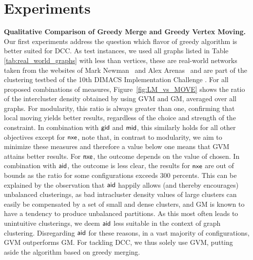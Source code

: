 \documentclass{llncs}
\newcommand{\measure}[1]{\ensuremath{\text{\normalfont{\sffamily {#1}}}}\xspace}
\newcommand{\andreapar}{\vspace*{.5ex}\par\noindent}
\begin{document}
\section{Experiments}
\andreapar\textbf{Qualitative Comparison of Greedy Merge and Greedy Vertex Moving.}
Our first experiments address the question which flavor of greedy algorithm is better suited for \textsc{DCC}.
As test instances, we used all graphs listed in Table \ref{tab:real_world_graphs} with less than  vertices, these are real-world networks taken from the websites of Mark Newman~\cite{newmanWS}
and Alex Arenas~\cite{arenasWS} and are part of the clustering testbed of the 10th DIMACS Implementation Challenge \cite{dimacsWS}.
For all proposed combinations of measures,
Figure~\ref{fig:LM_vs_MOVE} shows the ratio of the intercluster density obtained by using GVM and GM, averaged over all graphs.
For modularity, this ratio is always greater than one, confirming that local moving yields better results, regardless of the choice and strength of the constraint.
In combination with \measure{gid} and \measure{mid}, this similarly holds for all other objectives except for \measure{nxe}, note that, in contrast to modularity, we aim to minimize these measures and therefore a value below one means that GVM attains better results.
For \measure{nxe}, the outcome depends on the value of  chosen.
In combination with \measure{aid}, the outcome is less clear, the results for \measure{nxe} are out of bounds as the ratio for some configurations exceeds 300 percents.
This can be explained by the observation that \measure{aid} happily allows (and thereby encourages) unbalanced clusterings, as bad intracluster density values of large clusters can easily be compensated by a set of small and dense clusters, and GM is known to have a tendency to produce unbalanced partitions.
As this most often leads to unintuitive clusterings, we deem \measure{aid} less suitable in the context of graph clustering.
Disregarding \measure{aid} for these reasons, in a vast majority of configurations, GVM outperforms GM. 
For tackling \textsc{DCC}, we thus solely use GVM, putting aside the algorithm based on greedy merging.
\par
\end{document}

